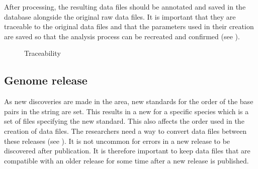 After processing, the resulting  data files should be annotated and saved in the database alongside the original raw data files. It is important that they are traceable to the original  data files and that the parameters used in their creation are saved so that the analysis process can be recreated and confirmed (see ).

\begin{figure}[h]
\caption{Traceability }
\label{fig:target_trace}
\end{figure}



\subsection{Genome release}
As new discoveries are made in the area, new standards for the order of the base pairs in the  string are set. This results in a new  for a specific species which is a set of files specifying the new standard. This also affects the order used in the creation of  data files. The researchers need a way to convert  data files between these releases (see ). It is not uncommon for errors in a new release to be discovered after publication. It is therefore important to keep data files that are compatible with an older release for some time after a new release is published.

